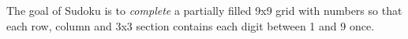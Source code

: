 \documentclass{cons-beamer}
\begin{document}
\begin{flashcardcpmpy}
\begin{frame}%
  \begin{example}
    The goal of Sudoku is to \textit{complete} a partially filled 9x9 grid with numbers so that each row, column and 3x3 section contains each digit between 1 and 9 once.
  \end{example}

  \begin{example}
    \vspace{-0.5em}
    
    \vspace{-0.5em}
  \end{example}
\end{frame}
\end{flashcardcpmpy}
\end{document}
